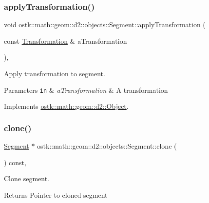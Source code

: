 \subsubsection{\texorpdfstring{apply\+Transformation()}{applyTransformation()}}
{\footnotesize\ttfamily void ostk\+::math\+::geom\+::d2\+::objects\+::\+Segment\+::apply\+Transformation (\begin{DoxyParamCaption}\item[{const \hyperlink{classostk_1_1math_1_1geom_1_1d2_1_1_transformation}{Transformation} \&}]{a\+Transformation }\end{DoxyParamCaption})\hspace{0.3cm}{\ttfamily [override]}, {\ttfamily [virtual]}}



Apply transformation to segment. 


\begin{DoxyParams}[1]{Parameters}
\mbox{\tt in}  & {\em a\+Transformation} & A transformation \\
\hline
\end{DoxyParams}


Implements \hyperlink{classostk_1_1math_1_1geom_1_1d2_1_1_object_a959e50211d7a680f7f904bbb752d75c9}{ostk\+::math\+::geom\+::d2\+::\+Object}.

\mbox{\label{classostk_1_1math_1_1geom_1_1d2_1_1objects_1_1_segment_ad0ba7ee144638335e4f02da0de38beab}} 
\subsubsection{\texorpdfstring{clone()}{clone()}}
{\footnotesize\ttfamily \hyperlink{classostk_1_1math_1_1geom_1_1d2_1_1objects_1_1_segment}{Segment} $\ast$ ostk\+::math\+::geom\+::d2\+::objects\+::\+Segment\+::clone (\begin{DoxyParamCaption}{ }\end{DoxyParamCaption}) const\hspace{0.3cm}{\ttfamily [override]}, {\ttfamily [virtual]}}



Clone segment. 

\begin{DoxyReturn}{Returns}
Pointer to cloned segment 
\end{DoxyReturn}


